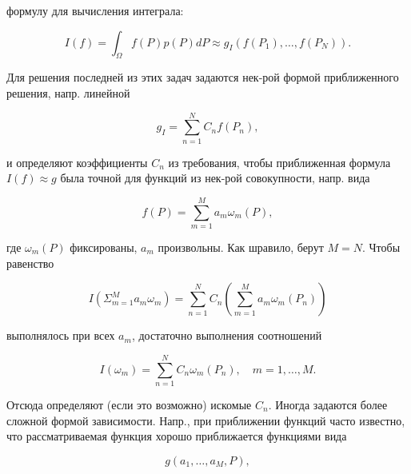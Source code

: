 \documentclass[10pt]{article}
\begin{document}
формулу для вычисления интеграла:



\[

I(f)=\int_{\Omega} f(P) p(P) d P \approx g_{I}\left(f\left(P_{1}\right), \ldots, f\left(P_{N}\right)\right) .

\]



Для решения последней из этих задач задаются нек-рой формой приближенного решения, напр. линейной



\[

g_{I}=\sum_{n=1}^{N} C_{n} f\left(P_{n}\right),

\]



и определяют коэффициенты $C_{n}$ из требования, чтобы приближенная формула $I(f) \approx g$ была точной для функций из нек-рой совокупности, напр. вида



\[

f(P)=\sum_{m=1}^{M} a_{m} \omega_{m}(P),

\]



где $\omega_{m}(P)$ фиксированы, $a_{m}$ произвольны. Как шравило, берут $M=N$. Чтобы равенство



\[

I\left(\Sigma_{m=1}^{M} a_{m} \omega_{m}\right)=\sum_{n=1}^{N} C_{n}\left(\sum_{m=1}^{M} a_{m} \omega_{m}\left(P_{n}\right)\right)

\]



выполнялось при всех $a_{m}$, достаточно выполнения соотношений



\[

I\left(\omega_{m}\right)=\sum_{n=1}^{N} C_{n} \omega_{m}\left(P_{n}\right), \quad m=1, \ldots, M .

\]



Отсюда определяют (если это возможно) искомые $C_{n}$. Иногда задаются более сложной формой зависимости. Напр., при приближении функций часто известно, что рассматриваемая функция хорошо приближается функциями вида



\[

g\left(a_{1}, \ldots, a_{M}, P\right),

\]
\end{document}
